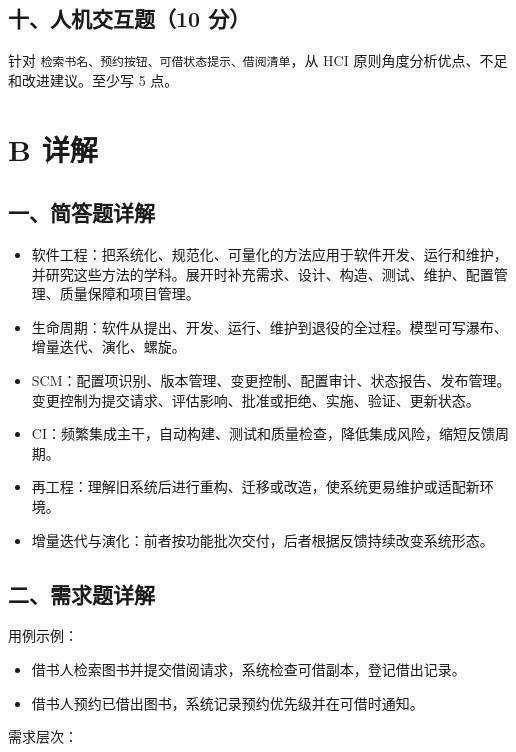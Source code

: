 \documentclass[UTF8,zihao=-4]{ctexart}
\begin{document}
\subsection{十、人机交互题（10 分）}


针对 \texttt{检索书名、预约按钮、可借状态提示、借阅清单}，从 HCI 原则角度分析优点、不足和改进建议。至少写 5 点。


\section{B 详解}


\subsection{一、简答题详解}


\begin{itemize}
\item 软件工程：把系统化、规范化、可量化的方法应用于软件开发、运行和维护，并研究这些方法的学科。展开时补充需求、设计、构造、测试、维护、配置管理、质量保障和项目管理。
\item 生命周期：软件从提出、开发、运行、维护到退役的全过程。模型可写瀑布、增量迭代、演化、螺旋。
\item SCM：配置项识别、版本管理、变更控制、配置审计、状态报告、发布管理。变更控制为提交请求、评估影响、批准或拒绝、实施、验证、更新状态。
\item CI：频繁集成主干，自动构建、测试和质量检查，降低集成风险，缩短反馈周期。
\item 再工程：理解旧系统后进行重构、迁移或改造，使系统更易维护或适配新环境。
\item 增量迭代与演化：前者按功能批次交付，后者根据反馈持续改变系统形态。
\end{itemize}



\subsection{二、需求题详解}


用例示例：


\begin{itemize}
\item 借书人检索图书并提交借阅请求，系统检查可借副本，登记借出记录。
\item 借书人预约已借出图书，系统记录预约优先级并在可借时通知。
\end{itemize}


需求层次：
\end{document}
